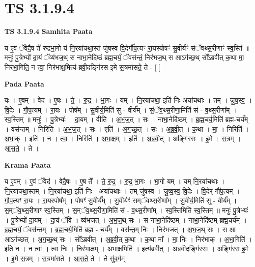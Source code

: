 \documentclass[17pt]{extarticle}
\begin{document}
\section{ TS 3.1.9.4 }

\textbf{TS 3.1.9.4 } \newline
\textbf{Samhita Paata} \newline

य ए॒वं ॅवेदै॒ष ते॑ रुद्रभा॒गो यं नि॒रया॑चथा॒स्तं जु॑षस्व वि॒देर्गौ॑प॒त्यꣳ रा॒यस्पोषꣳ॑ सु॒वीर्यꣳ॑ संॅवथ्स॒रीणाꣳ॑ स्व॒स्तिं ॥ मनुः॑ पु॒त्रेभ्यो॑ दा॒यं ॅव्य॑भज॒थ् स नाभा॒नेदि॑ष्ठं ब्रह्म॒चर्यं॒ ॅवस॑न्तं॒ निर॑भज॒थ् स आऽग॑च्छ॒थ् सो᳚ऽब्रवीत् क॒था मा॒ निर॑भा॒गिति॒ न त्वा॒ निर॑भाक्ष॒मित्य॑-ब्रवी॒दङ्गि॑रस इ॒मे स॒त्रमा॑सते॒ ते - [  ] \newline

\textbf{Pada Paata} \newline

यः । ए॒वम् । वेद॑ । ए॒षः । ते॒ । रु॒द्र॒ । भा॒गः । यम् । नि॒रया॑चथा॒ इति॑ निः-अया॑चथाः । तम् । जु॒ष॒स्व॒ । वि॒देः । गौ॒प॒त्यम् । रा॒यः । पोष᳚म् । सु॒वीर्य॒मिति॑ सु - वीर्य᳚म् । सं॒ॅव॒थ्स॒रीणा॒मिति॑ सं - व॒थ्स॒रीणा᳚म् । स्व॒स्तिम् ॥ मनुः॑ । पु॒त्रेभ्यः॑ । दा॒यम् । वीति॑ । अ॒भ॒ज॒त् । सः । नाभा॒नेदि॑ष्ठम् । ब्र॒ह्म॒चर्य॒मिति॑ ब्रह्म-चर्य᳚म् । वस॑न्तम् । निरिति॑ । अ॒भ॒ज॒त् । सः । एति॑ । अ॒ग॒च्छ॒त् । सः । अ॒ब्र॒वी॒त् । क॒था । मा॒ । निरिति॑ । अ॒भा॒क् । इति॑ । न । त्वा॒ । निरिति॑ । अ॒भा॒क्ष॒म् । इति॑ । अ॒ब्र॒वी॒त् । अङ्गि॑रसः । इ॒मे । स॒त्रम् । आ॒स॒ते॒ । ते ।  \newline


\textbf{Krama Paata} \newline

य ए॒वम् । ए॒वं ॅवेद॑ । वेदै॒षः । ए॒ष ते᳚ । ते॒ रु॒द्र॒ । रु॒द्र॒ भा॒गः । भा॒गो यम् । यम् नि॒रया॑चथाः । नि॒रया॑चथा॒स्तम् । नि॒रया॑चथा॒ इति॑ निः - अया॑चथाः । तम् जु॑षस्व । जु॒ष्व॒स्व॒ वि॒देः । वि॒देर् गौ॑प॒त्यम् । गौ॒प॒त्यꣳ रा॒यः । रा॒यस्पोष᳚म् । पोषꣳ॑ सु॒वीर्य᳚म् । सु॒वीर्यꣳ॑ सम्ॅवथ्स॒रीणा᳚म् । सु॒वीर्य॒मिति॑ सु - वीर्य᳚म् । स॒म्ॅव॒थ्स॒रीणाꣳ॑ स्व॒स्तिम् । स॒म्ॅव॒थ्स॒रीणा॒मिति॑ सं - व॒थ्स॒रीणा᳚म् । स्व॒स्तिमिति॑ स्व॒स्तिम् ॥ मनुः॑ पु॒त्रेभ्यः॑ । पु॒त्रेभ्यो॑ दा॒यम् । दा॒यं ॅवि । व्य॑भजत् । अ॒भ॒ज॒थ् सः । स नाभा॒नेदि॑ष्ठम् । नाभा॒नेदि॑ष्ठम् ब्रह्म॒चर्य᳚म् । ब्र॒ह्म॒चर्यं॒ ॅवस॑न्तम् । ब्र॒ह्म॒चर्य॒मिति॑ ब्रह्म - चर्य᳚म् । वस॑न्त॒म् निः । निर॑भजत् । अ॒भ॒ज॒थ् सः । स आ । आऽग॑च्छत् । अ॒ग॒च्छ॒थ् सः । सो᳚ऽब्रवीत् । अ॒ब्र॒वी॒त् क॒था । क॒था मा᳚ । मा॒ निः । निर॑भाक् । अ॒भा॒गिति॑ । इति॒ न । न त्वा᳚ । त्वा॒ निः । निर॑भाक्षम् । अ॒भा॒क्ष॒मिति॑ । इत्य॑ब्रवीत् । अ॒ब्र॒वी॒दङ्गि॑रसः । अङ्गि॑रस इ॒मे । इ॒मे स॒त्रम् । स॒त्रमा॑सते । आ॒स॒ते॒ ते । ते सु॑व॒र्गम् \newline
\end{document}
